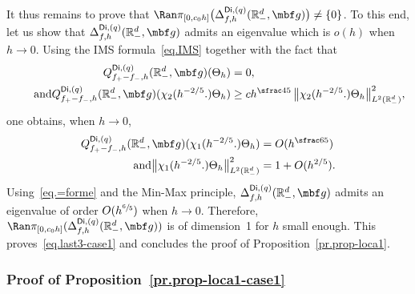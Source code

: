 It thus remains to prove that $\Ran \pi _{[0,c_0h]}\bigl(\Delta_{f,h}^{\mathsf{Di},(q)}(\mathbb R_-^d, \mbf g) \bigr) \neq \{0\}$. To this end, let us show that $\Delta_{f,h}^{\mathsf{Di},(q)}(\mathbb R_-^d, \mbf g)$ admits an eigenvalue which is $o(h)$ when $h\to 0$. Using the IMS formula~\eqref{eq.IMS} together with the fact that
\begin{align*}
Q_{f_+-f_-,h}^{\mathsf{Di},(q)}(\mathbb R_-^d, { \mbf g}) (\Theta_h)&=0,
\\
\tag*{and}
Q_{f_+-f_-,h}^{\mathsf{Di},(q)}(\mathbb R_-^d, { \mbf g}) (\chi_2(h^{-2/5 }.) \Theta_h) &\ge ch^{\sfrac 45}\, \big\Vert \chi_2(h^{-2/5 }.) \Theta_h\big\Vert_{L^2(\mathbb R_-^d)}^2,
\end{align*}
one obtains, when $h\to 0$,
\begin{align*}
Q_{f_+-f_-,h}^{\mathsf{Di},(q)}(\mathbb R_-^d, { \mbf g}) (\chi_1(h^{-2/5 }.) \Theta_h)&=O(h^{\sfrac 65})
\\
\tag*{and}
\big\Vert \chi_1(h^{-2/5 }.) \Theta_h\big\Vert_{L^2(\mathbb R_-^d)}^2&=1+O(h^{2/5 }).
\end{align*}
Using~\eqref{eq.=forme} and the Min-Max principle, $\Delta_{f,h}^{\mathsf{Di},(q)}(\mathbb R_-^d, \mbf g)$ admits an eigenvalue of order $O(h^{\sfrac 65})$ when $h\to 0$.
Therefore, $\Ran \pi_{[0,c_0h]}
(\Delta_{f,h}^{\mathsf{Di},(q)}(\mathbb R_-^d, \mbf g))$ is of
dimension~1 for $h$ small enough.
This proves~\eqref{eq.last3-case1} and concludes the proof of Proposition~\ref{pr.prop-loca1}.

\subsubsection{Proof of Proposition~\ref{pr.prop-loca1-case1}}\label{sec.prop-loca1-case1}

